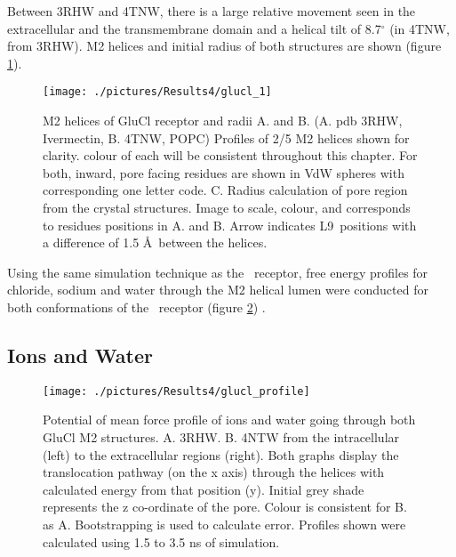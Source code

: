 Between 3RHW and 4TNW, there is a large relative movement seen in the extracellular and the transmembrane domain and a helical tilt of 8.7$^{\circ}$ (in 4TNW, from 3RHW). M2 helices and initial radius of both structures are shown (figure \ref{fig:glucl_1}). 
 
\begin{figure}[H]
\begin{center}
\texttt{[image: ./pictures/Results4/glucl\_1]}
\caption[M2 helices of GluCl receptor and radii.] {M2 helices of GluCl receptor and radii A. and B. (A. pdb 3RHW, Ivermectin, B. 4TNW, POPC) Profiles of 2/5 M2 helices shown for clarity. colour of each will be consistent throughout this chapter. For both, inward, pore facing residues are shown in VdW spheres with corresponding one letter code. C. Radius calculation of pore region from the crystal structures. Image to scale, colour, and corresponds to residues positions in A. and B. Arrow indicates L9\textquotesingle\ positions with a difference of 1.5 \AA\ between the helices.}
\label{fig:glucl_1}
\end{center}
\end{figure}

Using the same simulation technique as the \HT\ receptor, free energy profiles for chloride, sodium and water through the M2 helical lumen were conducted for both conformations of the \gl\ receptor  (figure \ref{fig:glucl_profile}) . 

\subsection{Ions and Water}
\begin{figure}[H]
\begin{center}
\texttt{[image: ./pictures/Results4/glucl\_profile]}
\caption[Potential of mean force profile of ions and water going through both GluCl M2 structures.] {Potential of mean force profile of ions and water going through both GluCl M2 structures. A. 3RHW. B. 4NTW from the intracellular (left) to the extracellular regions (right). Both graphs display the translocation pathway (on the x axis) through the helices with calculated energy from that position (y). Initial grey shade represents the z co-ordinate of the pore. Colour is consistent for B. as A. Bootstrapping is used to calculate error. Profiles shown were calculated using 1.5 to 3.5 ns of simulation.} 
\label{fig:glucl_profile}
\end{center}
\end{figure}

